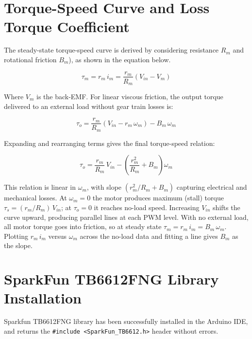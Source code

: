 \documentclass{article}
\begin{document}
\section{Torque-Speed Curve and Loss Torque Coefficient}

The steady-state torque-speed curve is derived by considering resistance $R_m$ and rotational friction $B_m$), as shown in the equation below.

\begin{equation}
    \tau_m = r_m\, i_m = \frac{r_m}{R_m}\left(V_{in} - V_m\right)
    \label{eq:ideal_torque}
\end{equation}

\noindent Where $V_m$ is the back-EMF. For linear viscous friction, the output torque delivered to an external load without gear train losses is:

\begin{equation}
    \tau_o = \frac{r_m}{R_m}\left(V_{in} - r_m\, \omega_m\right) - B_m\, \omega_m
    \label{eq:torque_intermediate}
\end{equation}

\noindent Expanding and rearranging terms gives the final torque-speed relation:

\begin{equation}
    \;\tau_o = \frac{r_m}{R_m}\, V_{in} - \left(\frac{r_m^2}{R_m} + B_m\right) \omega_m\;
    \label{eq:torque_speed}
\end{equation}

\noindent This relation is linear in $\omega_m$, with slope $\left(r_m^2/R_m + B_m\right)$ capturing electrical and mechanical losses. At $\omega_m = 0$ the motor produces maximum (stall) torque $\tau_s = (r_m/R_m)\,V_{in}$; at $\tau_o = 0$ it reaches no-load speed. Increasing $V_{in}$ shifts the curve upward, producing parallel lines at each PWM level. With no external load, all motor torque goes into friction, so at steady state $\tau_m = r_m\, i_m = B_m\, \omega_m$. Plotting $r_m\, i_m$ versus $\omega_m$ across the no-load data and fitting a line gives $B_m$ as the slope.

\section{SparkFun TB6612FNG Library Installation}

Sparkfun TB6612FNG library has been successfully installed in the Arduino IDE, and returns the \texttt{\#include <SparkFun\_TB6612.h>} header without errors.
\end{document}

